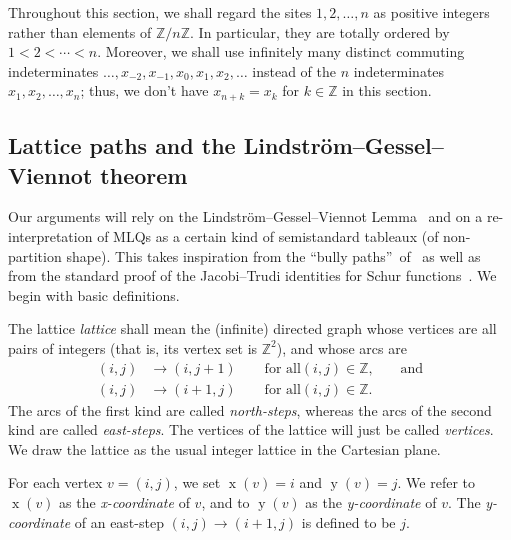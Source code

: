 \documentclass[reqno]{amsart}%
\newcommand{\0}{\phantom{c}}
\newcommand{\defn}[1]{{\color{darkred}\emph{#1}}}
\theoremstyle{plain}
\theoremstyle{definition}
\numberwithin{equation}{section}
\begin{document}
Throughout this section, we shall regard the sites $1,2,\ldots,n$ as positive
integers rather than elements of $\mathbb{Z}/n\mathbb{Z}$. In particular, they
are totally ordered by $1<2<\cdots<n$. Moreover, we shall use infinitely many
distinct commuting indeterminates $\ldots,x_{-2},x_{-1},x_{0},x_{1}%
,x_{2},\ldots$ instead of the $n$ indeterminates $x_{1},x_{2},\ldots,x_{n}$;
thus, we don't have $x_{n+k}=x_{k}$ for $k\in\mathbb{Z}$ in this section.

\subsection{Lattice paths and the Lindstr\"{o}m--Gessel--Viennot theorem}

Our arguments will rely on the Lindstr\"om--Gessel--Viennot
Lemma~\cite{GV85,Lindstrom73} and on a re-interpretation of MLQs as a certain
kind of semistandard tableaux (of non-partition shape). This takes inspiration
from the \textquotedblleft bully paths\textquotedblright\ of~\cite{AasLin17}
as well as from the standard proof of the Jacobi--Trudi identities for Schur
functions~\cite[First proof of Theorem 7.16.1]{Stanley-EC2}. We begin with
basic definitions.

The lattice \defn{lattice} shall mean the (infinite) directed graph whose
vertices are all pairs of integers (that is, its vertex set is $\mathbb{Z}%
^{2}$), and whose arcs are
\begin{align*}
\left(  i,j\right)   &  \rightarrow\left(  i,j+1\right)  \qquad\text{for all
}\left(  i,j\right)  \in\mathbb{Z}\text{,}\qquad\text{and}\\
\left(  i,j\right)   &  \rightarrow\left(  i+1,j\right)  \qquad\text{for all
}\left(  i,j\right)  \in\mathbb{Z}\text{.}%
\end{align*}
The arcs of the first kind are called \defn{north-steps}, whereas the arcs of
the second kind are called \defn{east-steps}. The vertices of the lattice will
just be called \defn{vertices}. We draw the lattice as the usual integer
lattice in the Cartesian plane.

For each vertex $v=\left(  i,j\right)  $, we set $\operatorname*{x}\left(
v\right)  =i$ and $\operatorname*{y}\left(  v\right)  =j$. We refer to
$\operatorname*{x}\left(  v\right)  $ as the \defn{x-coordinate} of $v$, and
to $\operatorname*{y}\left(  v\right)  $ as the \defn{y-coordinate} of $v$.
The \defn{y-coordinate} of an east-step $\left(  i,j\right)  \rightarrow
\left(  i+1,j\right)  $ is defined to be $j$.
\end{document}
